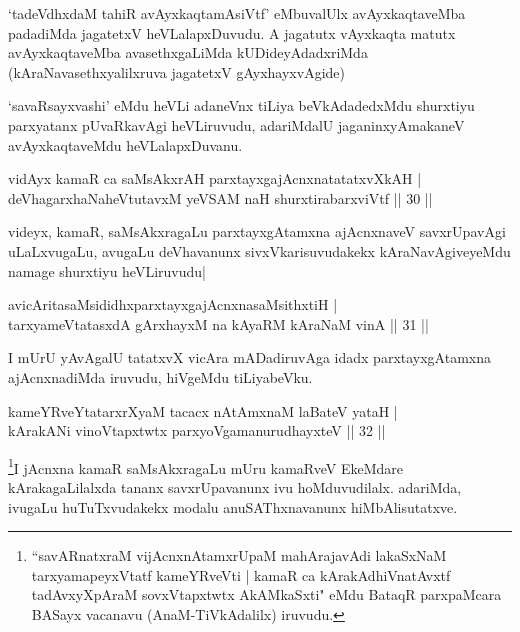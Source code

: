 \begin{artha}
`tadeVdhxdaM tahiR avAyxkaqtamAsiVtf' eMbuvalUlx avAyxkaqtaveMba padadiMda jagatetxV heVLalapxDuvudu. A jagatutx vAyxkaqta matutx avAyxkaqtaveMba avasethxgaLiMda kUDideyAdadxriMda (kAraNavasethxyalilxruva jagatetxV gAyxhayxvAgide)

`savaRsayxvashi' eMdu heVLi adaneVnx tiLiya beVkAdadedxMdu shurxtiyu parxyatanx pUvaRkavAgi heVLiruvudu, adariMdalU jaganinxyAmakaneV avAyxkaqtaveMdu heVLalapxDuvanu.
\end{artha}


\begin{shl}
vidAyx kamaR ca saMsAkxrAH parxtayxgajAcnxnatatatxvXkAH |\\
deVhagarxhaNaheVtutavxM yeVSAM naH shurxtirabarxviVtf \hfill || 30 ||
\end{shl}

\begin{artha}
videyx, kamaR, saMsAkxragaLu parxtayxgAtamxna ajAcnxnaveV savxrUpavAgi uLaLxvugaLu, avugaLu deVhavanunx sivxVkarisuvudakekx kAraNavAgiveyeMdu namage shurxtiyu heVLiruvudu|
\end{artha}

\begin{shl}
avicAritasaMsididhxparxtayxgajAcnxnasaMsithxtiH |\\
tarxyameVtatasxdA gArxhayxM na kAyaRM kAraNaM vinA \hfill || 31 ||
\end{shl}

\begin{artha}
I mUrU yAvAgalU tatatxvX vicAra mADadiruvAga idadx parxtayxgAtamxna ajAcnxnadiMda iruvudu, hiVgeMdu tiLiyabeVku. 
\end{artha}


\begin{shl}
kameYRveYtatarxrXyaM tacacx nA\s \s tAmxnaM laBateV yataH |\\
kArakANi vinoVtapxtwtx parxyoVgamanurudhayxteV \hfill || 32 ||
\end{shl}

\begin{artha}
\footnote{``savARnatxraM vijAcnxnAtamxrUpaM mahArajavAdi lakaSxNaM tarxyamapeyxVtatf kameYRveVti | kamaR ca kArakAdhiVnatAvxtf tadAvxyXpAraM sovxVtapxtwtx AkAMkaSxti" eMdu BataqR parxpaMcara BASayx vacanavu (AnaM-TiVkAdalilx) iruvudu.}I jAcnxna kamaR saMsAkxragaLu mUru kamaRveV EkeMdare kArakagaLilalxda tananx savxrUpavanunx ivu hoMduvudilalx. adariMda, ivugaLu huTuTxvudakekx modalu anuSAThxnavanunx hiMbAlisutatxve.
\end{artha}

